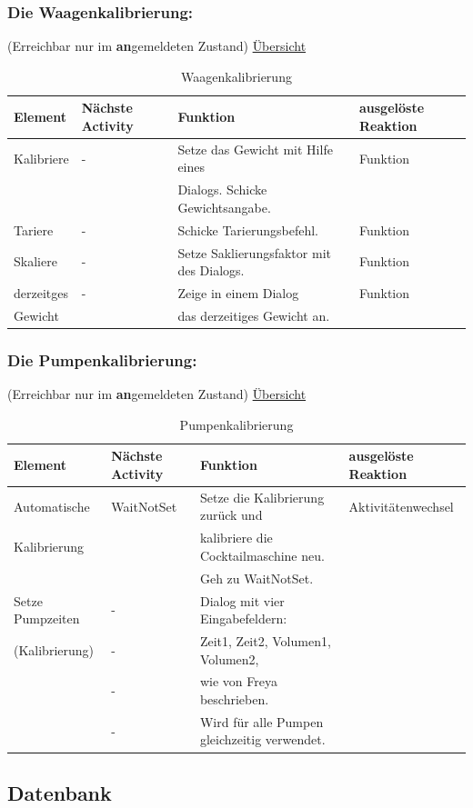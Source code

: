 \subsubsection{Die Waagenkalibrierung:}
(Erreichbar nur im \textbf{an}gemeldeten Zustand)
\hyperref[table:weight]{Übersicht}
\begin{table}
	\centering
	\label{table:weight}
	\caption{Waagenkalibrierung}
	\begin{tabular}{|l|l|l|l|}
		\hline
		\textbf{Element } & \textbf{Nächste Activity } & \textbf{Funktion } & \textbf{ausgelöste Reaktion} \\ \hline
		Kalibriere  & -  & Setze das Gewicht mit Hilfe eines  & Funktion \\
		   &    & Dialogs. Schicke Gewichtsangabe.  &   \\ \hline
		Tariere  & -  & Schicke Tarierungsbefehl.  & Funktion \\ \hline
		Skaliere  & -  & Setze Saklierungsfaktor mit des Dialogs.  & Funktion \\ \hline
		derzeitges    & -  & Zeige in einem Dialog   & Funktion \\
		 Gewicht  &    & das derzeitiges Gewicht an.  &   \\ \hline
	\end{tabular}
\end{table}

\subsubsection{Die Pumpenkalibrierung:}
(Erreichbar nur im \textbf{an}gemeldeten Zustand)
\hyperref[table:pump]{Übersicht}
\begin{table}
	\centering
	\label{table:pump}
	\caption{Pumpenkalibrierung}
	\begin{tabular}{|l|l|l|l|}
		\hline
		\textbf{Element } & \textbf{Nächste Activity } & \textbf{Funktion } & \textbf{ausgelöste Reaktion} \\ \hline
		Automatische   & WaitNotSet  & Setze die Kalibrierung zurück und  & Aktivitätenwechsel \\
		 Kalibrierung  &   & kalibriere die Cocktailmaschine neu.   &  \\ 
		   &   & Geh zu WaitNotSet.  &  \\ \hline
		Setze Pumpzeiten  & -  & Dialog mit vier Eingabefeldern:   &  \\	
		 (Kalibrierung)  & -  &  Zeit1, Zeit2, Volumen1, Volumen2,   &  \\
		   & -  &  wie von Freya beschrieben.  &  \\
		   & -  &  Wird für alle Pumpen gleichzeitig verwendet.  &  \\ \hline
	\end{tabular}
\end{table}




\subsection{Datenbank}

